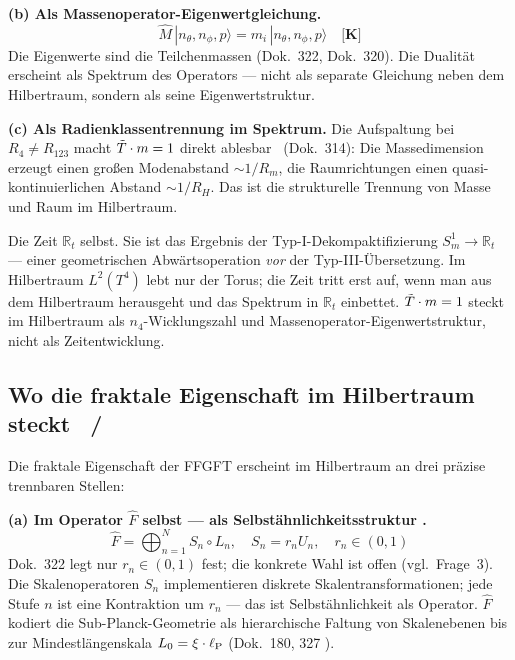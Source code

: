 \textbf{(b) Als Massenoperator-Eigenwertgleichung.}
\begin{equation}
  \hat{M}\,|n_\theta,n_\phi,p\rangle = m_i\,|n_\theta,n_\phi,p\rangle
  \quad\textbf{[K]}
\end{equation}
Die Eigenwerte sind die Teilchenmassen (Dok.~322, Dok.~320).
Die Dualität erscheint als Spektrum des Operators — nicht als
separate Gleichung neben dem Hilbertraum, sondern als seine
Eigenwertstruktur.

\textbf{(c) Als Radienklassentrennung im Spektrum.}
Die Aufspaltung bei $R_4 \neq R_{123}$ macht $\tilde{T}\cdot m = 1$
direkt ablesbar \K\ (Dok.~314): Die Massedimension erzeugt
einen großen Modenabstand $\sim 1/R_m$, die Raumrichtungen
einen quasi-kontinuierlichen Abstand $\sim 1/R_H$.
Das ist die strukturelle Trennung von Masse und Raum im Hilbertraum.

\begin{tcolorbox}[ffgftbox,title={Was im Hilbertraum \emph{nicht} erscheint}]
  Die Zeit $\mathbb{R}_t$ selbst. Sie ist das Ergebnis der
  Typ-I-Dekompaktifizierung $S^1_m \to \mathbb{R}_t$ — einer
  geometrischen Abwärtsoperation \emph{vor} der Typ-III-Übersetzung.
  Im Hilbertraum $L^2(T^4)$ lebt nur der Torus;
  die Zeit tritt erst auf, wenn man aus dem Hilbertraum herausgeht
  und das Spektrum in $\mathbb{R}_t$ einbettet.
  $\tilde{T}\cdot m = 1$ steckt im Hilbertraum als $n_4$-Wicklungszahl
  und Massenoperator-Eigenwertstruktur, nicht als Zeitentwicklung.
\end{tcolorbox}

\subsection{Wo die fraktale Eigenschaft im Hilbertraum steckt \K\ / \B}
\label{sec:fraktal-hilbert}

Die fraktale Eigenschaft der FFGFT erscheint im Hilbertraum an
drei präzise trennbaren Stellen:

\textbf{(a) Im Operator $\hat{F}$ selbst — als Selbstähnlichkeitsstruktur \B.}
\begin{equation}
  \hat{F} = \bigoplus_{n=1}^{N} S_n\circ L_n,\quad
  S_n = r_n U_n,\quad r_n \in (0,1)
\end{equation}
Dok.~322 legt nur $r_n \in (0,1)$ fest; die konkrete Wahl ist offen (vgl.\ Frage~3).
Die Skalenoperatoren $S_n$ implementieren diskrete Skalentransformationen;
jede Stufe $n$ ist eine Kontraktion um $r_n$ — das ist
Selbstähnlichkeit als Operator.
$\hat{F}$ kodiert die Sub-Planck-Geometrie als hierarchische Faltung
von Skalenebenen bis zur Mindestlängenskala $L_0 = \xi\cdot\ell_{\mathrm{P}}$
(Dok.~180, 327 \K).

